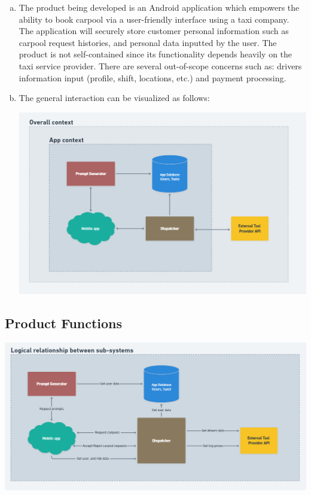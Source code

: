 \documentclass[]{article}
\begin{document}
\begin{enumerate}[a)]
	\item The product being developed is an Android application which empowers the ability to book carpool via a user-friendly interface using a taxi company. The application will securely store customer personal information such as carpool request histories, and personal data inputted by the user. The product is not self-contained since its functionality depends heavily on the taxi service provider. There are several out-of-scope concerns such as: driver\textquotesingle s information input (profile, shift, locations, etc.) and payment processing.
	\item The general interaction can be visualized as follows: 
	\begin{center}
		\includegraphics[scale=0.5]{app-context.png}
	\end{center}
\end{enumerate}


\subsection{Product Functions}
\label{sub:product_functions}
	\begin{center}
		\includegraphics[scale=0.5]{subsys-relationship.png}
	\end{center}
\end{document}
